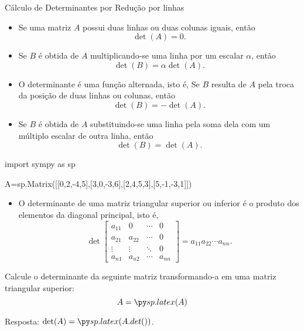 \begin{frame}[label=determinantes]{Cálculo de Determinantes por Redução por linhas}

\begin{itemize}

\item Se uma matriz $A$ possui duas linhas ou duas colunas iguais, então 
\[\det(A)=0.\]

\item Se $B$ é obtida de $A$ multiplicando-se uma linha por um escalar $\alpha$, então 
\[\det(B)=\alpha \det(A).\]

\item O determinante é uma {\color{blue}função alternada}, isto é, Se $B$ resulta de $A$ pela troca da posição de duas linhas ou colunas, então 
\[\det(B)=-\det(A).\]

\item Se $B$ é obtida de $A$  substituindo-se uma linha pela soma dela com um múltiplo escalar de outra linha, então 
\[\det(B)=\det(A).\]

\end{itemize}

\end{frame}

\begin{frame}[label=determinantes,fragile=singleslide]
\begin{pycode}
import sympy as sp

A=sp.Matrix([[0,2,-4,5],[3,0,-3,6],[2,4,5,3],[5,-1,-3,1]])
\end{pycode}
\begin{itemize}
\item  O determinante de uma matriz triangular superior ou inferior é o produto dos elementos da diagonal principal, isto é,
\[
\det \begin{bmatrix}
a_{11} & 0 & \cdots & 0\\
a_{21} & a_{22} & \cdots & 0\\
\vdots & \vdots & \ddots & 0\\ 
a_{n1} & a_{n2} & \cdots & a_{nn}
\end{bmatrix}= a_{11}a_{22}\cdots a_{nn}.
\]
\end{itemize}

\begin{exe}
Calcule  o determinante da seguinte matriz transformando-a em uma matriz triangular superior:
\[A=\pyl{A}\]

Resposta: $\det(A)=\pyl{A.det()}$.
\end{exe}



\end{frame}





